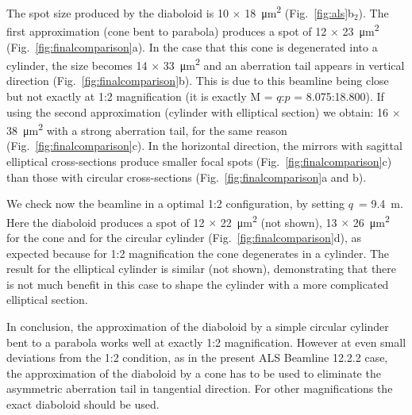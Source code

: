 \documentclass[preprint]{iucr}       %
\newcommand{\inblue}[1]{{\color{blue}#1}}
\begin{document}
The spot size produced by the diaboloid is 10 $\times$ \SI{18}{\micro\meter^2} (Fig.~\ref{fig:als}b$_2$). The first approximation (cone bent to parabola) produces a spot of 12 $\times$ \SI{23}{\micro\meter^2} (Fig.~\ref{fig:finalcomparison}a). In the case that this cone is degenerated into a cylinder, the size becomes 14 $\times$ \SI{33}{\micro\meter^2} and an aberration tail appears in vertical direction (Fig.~\ref{fig:finalcomparison}b). This is due to this beamline being close but not exactly at 1:2 magnification (it is exactly M = $q$:$p$ = 8.075:18.800). If using the second approximation (cylinder with elliptical section) we obtain: 16 $\times$ \SI{38}{\micro\meter^2} with a strong aberration tail, for the same reason (Fig.~\ref{fig:finalcomparison}c). \inblue{In the horizontal direction, the mirrors with sagittal elliptical cross-sections produce smaller focal spots (Fig.~\ref{fig:finalcomparison}c) than those with circular cross-sections (Fig.~\ref{fig:finalcomparison}a and b).}

We check now the beamline in a optimal 1:2 configuration, by setting $q$~= \SI{9.4}{\meter}. Here the diaboloid produces a spot of 12 $\times$ \SI{22}{\micro\meter^2} (not shown), 13 $\times$ \SI{26}{\micro\meter^2} for the cone and for the circular cylinder (Fig.~\ref{fig:finalcomparison}d), as expected because for 1:2 magnification the cone degenerates in a cylinder. The result for the elliptical cylinder is similar (not shown), demonstrating that there is not much benefit in this case to shape the cylinder with a more complicated elliptical section.  

In conclusion, the approximation of the diaboloid by a simple circular cylinder bent to a parabola works well at exactly 1:2 magnification. However at even small deviations from the 1:2 condition, as in the present ALS Beamline 12.2.2 case, the approximation of the diaboloid by a cone has to be used to eliminate the asymmetric aberration tail in tangential direction. For other magnifications the exact diaboloid should be used.
\end{document}
